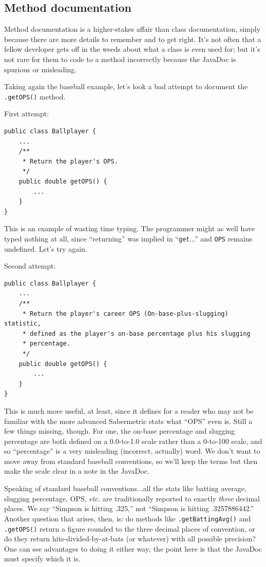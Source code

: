 \subsection{Method documentation}

Method documentation is a higher-stakes affair than class documentation,
simply because there are more details to remember and to get right. It's not
often that a fellow developer gets off in the weeds about what a class is even
used for; but it's not rare for them to code to a method incorrectly because
the JavaDoc is spurious or misleading.

Taking again the baseball example, let's look a bad attempt to document the
\texttt{.getOPS()} method.

First attempt:
\vspace{-.15in}
\begin{Verbatim}[fontsize=\small,samepage=true,frame=single]
public class Ballplayer {
    ...
    /**
     * Return the player's OPS.
     */
    public double getOPS() {
        ...
    }
}
\end{Verbatim}

This is an example of wasting time typing. The programmer might as well have
typed nothing at all, since ``returning'' was implied in ``\texttt{get}...'' and
\texttt{OPS} remains undefined. Let's try again.

Second attempt:
\vspace{-.15in}
\begin{Verbatim}[fontsize=\small,samepage=true,frame=single]
public class Ballplayer {
    ...
    /**
     * Return the player's career OPS (On-base-plus-slugging) statistic,
     * defined as the player's on-base percentage plus his slugging 
     * percentage.
     */
    public double getOPS() {
        ...
    }
}
\end{Verbatim}

This is much more useful, at least, since it defines for a reader who may not
be familiar with the more advanced Sabermetric stats what ``OPS'' even is.
Still a few things missing, though. For one, the on-base percentage and
slugging percentage are both defined on a 0.0-to-1.0 scale rather than a
0-to-100 scale, and so ``percentage'' is a very misleading (incorrect,
actually) word. We don't want to move away from standard baseball
conventions, so we'll keep the terms but then make the scale clear in a note
in the JavaDoc.

Speaking of standard baseball conventions...all the stats like batting
average, slugging percentage, OPS, \textit{etc.} are traditionally reported to
exactly \textit{three} decimal places. We say ``Simpson is hitting .325,'' not
``Simpson is hitting .3257886442.'' Another question that arises, then, is: do
methods like \texttt{.getBattingAvg()} and \texttt{.getOPS()} return a figure
rounded to the three decimal places of convention, or do they return
hits-divided-by-at-bats (or whatever) with all possible precision? One can see
advantages to doing it either way; the point here is that the JavaDoc must
specify which it is.

